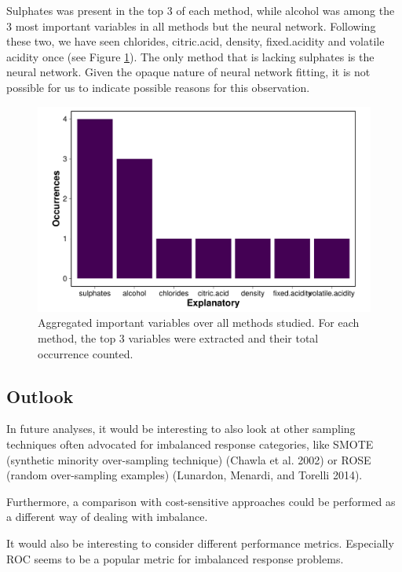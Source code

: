 \documentclass[11pt,]{article}
\begin{document}
Sulphates was present in the top 3 of each method, while alcohol was
among the 3 most important variables in all methods but the neural
network. Following these two, we have seen chlorides, citric.acid,
density, fixed.acidity and volatile acidity once (see Figure
\ref{fig:impvarcomp}). The only method that is lacking sulphates is the
neural network. Given the opaque nature of neural network fitting, it is
not possible for us to indicate possible reasons for this observation.

\begin{figure}

{\centering \includegraphics[width=0.75\linewidth]{./figures/impvarcomp-1} 

}

\caption{Aggregated important variables over all methods studied. For each method, the top 3 variables were extracted and their total occurrence counted.}\label{fig:impvarcomp}
\end{figure}

\hypertarget{outlook}{%
\subsection{Outlook}\label{outlook}}

In future analyses, it would be interesting to also look at other
sampling techniques often advocated for imbalanced response categories,
like SMOTE (synthetic minority over-sampling technique) (Chawla et al.
2002) or ROSE (random over-sampling examples) (Lunardon, Menardi, and
Torelli 2014).

Furthermore, a comparison with cost-sensitive approaches could be
performed as a different way of dealing with imbalance.

It would also be interesting to consider different performance metrics.
Especially ROC seems to be a popular metric for imbalanced response
problems.
\end{document}
